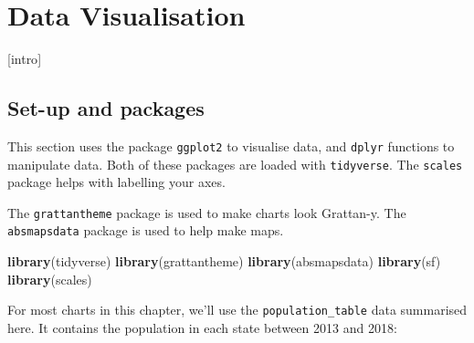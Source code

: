 \documentclass[]{book}
\newenvironment{Shaded}{\begin{snugshade}}{\end{snugshade}}
\newcommand{\CommentTok}[1]{\textcolor[rgb]{0.56,0.35,0.01}{\textit{#1}}}
\newcommand{\DataTypeTok}[1]{\textcolor[rgb]{0.13,0.29,0.53}{#1}}
\newcommand{\KeywordTok}[1]{\textcolor[rgb]{0.13,0.29,0.53}{\textbf{#1}}}
\newcommand{\NormalTok}[1]{#1}
\newcommand{\OperatorTok}[1]{\textcolor[rgb]{0.81,0.36,0.00}{\textbf{#1}}}
\newcommand{\StringTok}[1]{\textcolor[rgb]{0.31,0.60,0.02}{#1}}
\begin{document}
\hypertarget{data-visualisation}{%
\chapter{Data Visualisation}\label{data-visualisation}}

{[}intro{]}

\hypertarget{set-up-and-packages}{%
\section{Set-up and packages}\label{set-up-and-packages}}

This section uses the package \texttt{ggplot2} to visualise data, and \texttt{dplyr} functions to manipulate data. Both of these packages are loaded with \texttt{tidyverse}. The \texttt{scales} package helps with labelling your axes.

The \texttt{grattantheme} package is used to make charts look Grattan-y. The \texttt{absmapsdata} package is used to help make maps.

\begin{Shaded}
\begin{Highlighting}[]
\KeywordTok{library}\NormalTok{(tidyverse)}
\KeywordTok{library}\NormalTok{(grattantheme)}
\KeywordTok{library}\NormalTok{(absmapsdata)}
\KeywordTok{library}\NormalTok{(sf)}
\KeywordTok{library}\NormalTok{(scales)}
\end{Highlighting}
\end{Shaded}

For most charts in this chapter, we'll use the \texttt{population\_table} data summarised here. It contains the population in each state between 2013 and 2018:

\begin{Shaded}
\end{Shaded}
\end{document}
